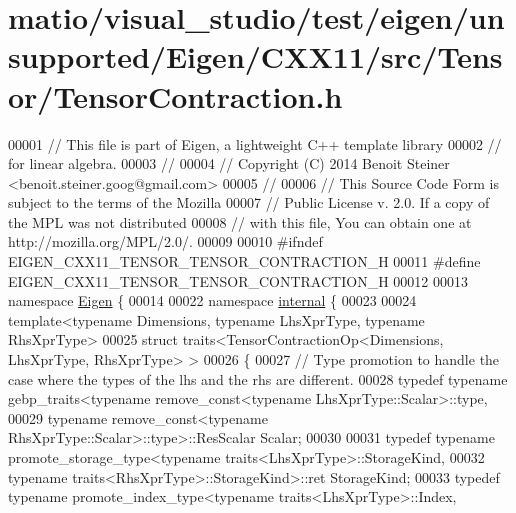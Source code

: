 \hypertarget{matio_2visual__studio_2test_2eigen_2unsupported_2_eigen_2_c_x_x11_2src_2_tensor_2_tensor_contraction_8h_source}{}\section{matio/visual\+\_\+studio/test/eigen/unsupported/\+Eigen/\+C\+X\+X11/src/\+Tensor/\+Tensor\+Contraction.h}
\label{matio_2visual__studio_2test_2eigen_2unsupported_2_eigen_2_c_x_x11_2src_2_tensor_2_tensor_contraction_8h_source}

\begin{DoxyCode}
00001 \textcolor{comment}{// This file is part of Eigen, a lightweight C++ template library}
00002 \textcolor{comment}{// for linear algebra.}
00003 \textcolor{comment}{//}
00004 \textcolor{comment}{// Copyright (C) 2014 Benoit Steiner <benoit.steiner.goog@gmail.com>}
00005 \textcolor{comment}{//}
00006 \textcolor{comment}{// This Source Code Form is subject to the terms of the Mozilla}
00007 \textcolor{comment}{// Public License v. 2.0. If a copy of the MPL was not distributed}
00008 \textcolor{comment}{// with this file, You can obtain one at http://mozilla.org/MPL/2.0/.}
00009 
00010 \textcolor{preprocessor}{#ifndef EIGEN\_CXX11\_TENSOR\_TENSOR\_CONTRACTION\_H}
00011 \textcolor{preprocessor}{#define EIGEN\_CXX11\_TENSOR\_TENSOR\_CONTRACTION\_H}
00012 
00013 \textcolor{keyword}{namespace }\hyperlink{namespace_eigen}{Eigen} \{
00014 
00022 \textcolor{keyword}{namespace }\hyperlink{namespaceinternal}{internal} \{
00023 
00024 \textcolor{keyword}{template}<\textcolor{keyword}{typename} Dimensions, \textcolor{keyword}{typename} LhsXprType, \textcolor{keyword}{typename} RhsXprType>
00025 \textcolor{keyword}{struct }traits<TensorContractionOp<Dimensions, LhsXprType, RhsXprType> >
00026 \{
00027   \textcolor{comment}{// Type promotion to handle the case where the types of the lhs and the rhs are different.}
00028   \textcolor{keyword}{typedef} \textcolor{keyword}{typename} gebp\_traits<typename remove\_const<typename LhsXprType::Scalar>::type,
00029                                \textcolor{keyword}{typename} remove\_const<typename RhsXprType::Scalar>::type>::ResScalar Scalar;
00030 
00031   \textcolor{keyword}{typedef} \textcolor{keyword}{typename} promote\_storage\_type<typename traits<LhsXprType>::StorageKind,
00032                                         \textcolor{keyword}{typename} traits<RhsXprType>::StorageKind>::ret StorageKind;
00033   \textcolor{keyword}{typedef} \textcolor{keyword}{typename} promote\_index\_type<typename traits<LhsXprType>::Index,

\end{DoxyCode}
